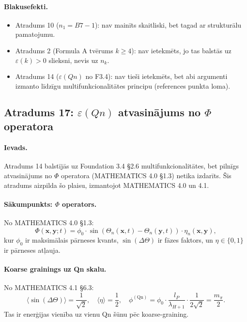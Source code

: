 \documentclass[12pt,a4paper]{article}
\begin{document}
\paragraph{Blakusefekti.}
\begin{itemize}
    \item Atradums 10 ($n_1 = B7-1$): nav mainīts skaitliski, bet tagad ar strukturālu pamatojumu.
    \item Atradums 2 (Formula A tvērums $k\geq 4$): nav ietekmēts, jo tas balstās uz $\varepsilon(k) > 0$ slieksni, nevis uz $n_k$.
    \item Atradums 14 ($\varepsilon(Qn)$ no F3.4): nav tieši ietekmēts, bet abi argumenti izmanto līdzīgu multifunkcionalitātes principu (references punkta loma).
\end{itemize}

\subsection*{Atradums 17: $\varepsilon(Qn)$ atvasinājums no $\Phi$ operatora}

\paragraph{Ievads.}
Atradums 14 balstījās uz Foundation 3.4 §2.6 multifunkcionalitātes, bet pilnīgs atvasinājums no $\Phi$ operatora (MATHEMATICS 4.0 §1.3) netika izdarīts. Šis atradums aizpilda šo plaisu, izmantojot MATHEMATICS 4.0 un 4.1.

\paragraph{Sākumpunkts: $\Phi$ operators.}
No MATHEMATICS 4.0 §1.3:
\[
\Phi(\mathbf{x}, \mathbf{y}; t) = \phi_0 \cdot \sin\left(\Theta_n(\mathbf{x}, t) - \Theta_n(\mathbf{y}, t)\right) \cdot \eta_n(\mathbf{x}, \mathbf{y}),
\]
kur $\phi_0$ ir maksimālais pārneses kvants, $\sin(\Delta\Theta)$ ir fāzes faktors, un $\eta \in \{0,1\}$ ir pārneses atļauja.

\paragraph{Koarse grainings uz Qn skalu.}
No MATHEMATICS 4.1 §6.3:
\[
\langle \sin(\Delta\Theta) \rangle = \frac{1}{\sqrt{2}}, \quad
\langle \eta \rangle = \frac{1}{2}, \quad
\phi^{(\text{Qn})} = \phi_0 \cdot \frac{l_P}{\lambda_{H+1}} \cdot \frac{1}{2\sqrt{2}} = \frac{m_\pi}{2}.
\]
Tas ir enerģijas vienība uz vienu Qn šūnu pēc koarse-graining.
\end{document}
